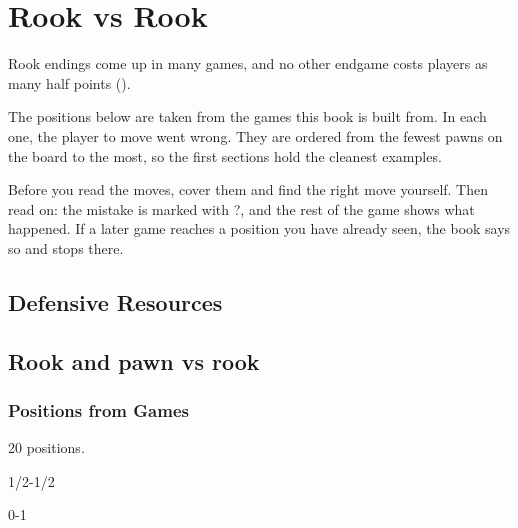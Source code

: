 \chapter{Rook vs Rook}\label{ch:rook-vs-rook}
Rook endings come up in many games, and no other endgame costs players as many half
points ().

The positions below are taken from the games this book is built from. In each
one, the player to move went wrong. They are ordered from the fewest pawns on the board to the
most, so the first sections hold the cleanest examples.

Before you read the moves, cover them and find the right move yourself. Then read on: the
mistake is marked with ?, and the rest of the game shows what happened. If a later game reaches
a position you have already seen, the book says so and stops there.


\section{Defensive Resources}





\section{Rook and pawn vs rook}
\subsection{Positions from Games}
20 positions.


1/2-1/2\par
{}

0-1\par
{}

